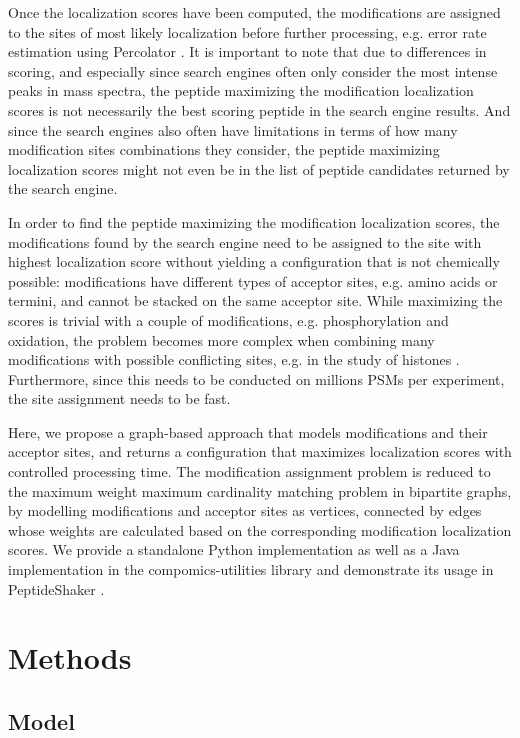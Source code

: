 \documentclass[]{article}
\begin{document}
Once the localization scores have been computed, the modifications are assigned to the sites of most likely localization before further processing, e.g. error rate estimation using Percolator \cite{Percolator}. It is important to note that due to differences in scoring, and especially since search engines often only consider the most intense peaks in mass spectra, the peptide maximizing the modification localization scores is not necessarily the best scoring peptide in the search engine results. And since the search engines also often have limitations in terms of how many modification sites combinations they consider, the peptide maximizing localization scores might not even be in the list of peptide candidates returned by the search engine.

In order to find the peptide maximizing the modification localization scores, the modifications found by the search engine need to be assigned to the site with highest localization score without yielding a configuration that is not chemically possible: modifications have different types of acceptor sites, e.g. amino acids or termini, and cannot be stacked on the same acceptor site. While maximizing the scores is trivial with a couple of modifications, e.g. phosphorylation and oxidation, the problem becomes more complex when combining many modifications with possible conflicting sites, e.g. in the study of histones \cite{Histone_study}. Furthermore, since this needs to be conducted on millions PSMs per experiment, the site assignment needs to be fast.

Here, we propose a graph-based approach that models modifications and their acceptor sites, and returns a configuration that maximizes localization scores with controlled processing time. The modification assignment problem is reduced to the maximum weight maximum cardinality matching problem in bipartite graphs, by modelling modifications and acceptor sites as vertices, connected by edges whose weights are calculated based on the corresponding modification localization scores. We provide a standalone Python implementation as well as a Java implementation in the compomics-utilities library \cite{compomics} and demonstrate its usage in PeptideShaker \cite{PeptideShaker}.

\section{Methods}

\subsection{Model}
\end{document}
